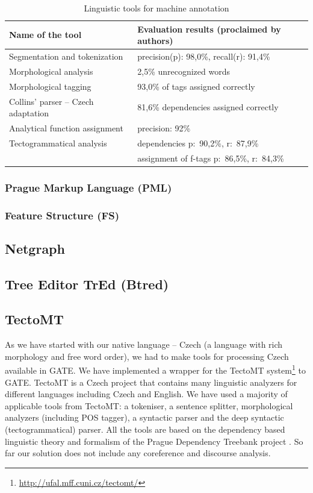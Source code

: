 \begin{table}
\centering
	\begin{tabular}{l|l}
		Name of the tool & Evaluation results (proclaimed by authors) \\[4pt]
		\hline
	Segmentation and tokenization & precision(p): 98,0\%, recall(r): 91,4\% \\[4pt]
	Morphological analysis & 2,5\% unrecognized words\\
	Morphological tagging & 93,0\% of tags assigned correctly \\[4pt]
	Collins' parser -- Czech adaptation & 81,6\% dependencies assigned correctly\\
	Analytical function assignment & precision: 92\% \\[4pt]
	Tectogrammatical analysis & dependencies p:~90,2\%, r:~87,9\%\\
	& assignment of f-tags p:~86,5\%, r:~84,3\%\\
	\end{tabular}
\caption{Linguistic tools for machine annotation}
\label{tab:ling_tools}
\end{table}



\subsubsection{Prague Markup Language (PML)}
\subsubsection{Feature Structure (FS)}


\subsection{Netgraph}

\subsection{Tree Editor TrEd (Btred)}

\subsection{TectoMT}
As we have started with our native language -- Czech (a language with rich morphology and free word order), we had to make tools for processing Czech available in GATE. We have implemented a wrapper for the TectoMT system\footnote{\url{http://ufal.mff.cuni.cz/tectomt/}} \citep{dedek:ZaPtTectoMTHighly2008} to GATE. TectoMT is a Czech project that contains many linguistic analyzers for different languages including Czech and English. We have used a majority of applicable tools from TectoMT: a tokeniser, a sentence splitter, morphological analyzers (including POS tagger), a syntactic parser and the deep syntactic (tectogrammatical) parser. All the tools are based on the dependency based linguistic theory and formalism of the Prague Dependency Treebank project \citep{dedek:PDT20_CD}. So far our solution does not include any coreference and discourse analysis.



